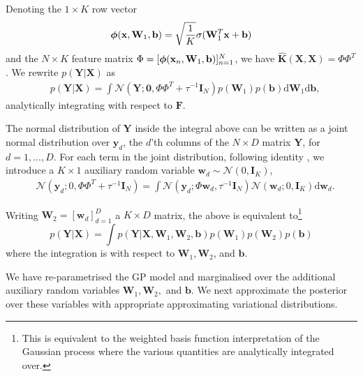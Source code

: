 \documentclass{article} %
\newcommand{\N}{\mathcal{N}}
\newcommand{\td}{\text{d}}
\newcommand{\x}{\mathbf{x}}
\newcommand{\Bb}{\mathbf{b}}
\newcommand{\y}{\mathbf{y}}
\newcommand{\w}{\mathbf{w}}
\newcommand{\W}{\mathbf{W}}
\newcommand{\X}{\mathbf{X}}
\newcommand{\Y}{\mathbf{Y}}
\newcommand{\F}{\mathbf{F}}
\newcommand{\I}{\mathbf{I}}
\newcommand{\bz}{\mathbf{0}}
\newcommand{\bphi}{\text{\boldmath$\phi$}}
\newcommand{\Kh}{\widehat{\mathbf{K}}}
\theoremstyle{definition}
\begin{document}
Denoting the $1 \times K$ row vector 
\begin{align*}
\bphi(\x, \W_1, \Bb) = \sqrt{\frac{1}{K}} \sigma(\W_1^T \x + \Bb) 
\end{align*}
and the $N \times K$ feature matrix $\Phi = [\bphi(\x_n, \W_1, \Bb)]_{n=1}^N$, we have $\Kh(\X,\X) = \Phi\Phi^T$.
We rewrite $p(\Y | \X)$ as 
\begin{align*}
&p(\Y | \X) = \int \N(\Y; \bz, \Phi\Phi^T + \tau^{-1} \I_N) p(\W_1)p(\Bb) \td \W_1 \td \Bb,
\end{align*}
analytically integrating with respect to $\F$.

The normal distribution of $\Y$ inside the integral above can be written as a joint normal distribution over $\y_d$, the $d$'th columns of the $N \times D$ matrix $\Y$, for $d = 1, ..., D$. 
For each term in the joint distribution, following identity \citep[page 93]{Bishop2006Pattern}, we introduce a $K \times 1$ auxiliary random variable $\w_d \sim \N(0, \I_K)$,
\begin{align}\label{eq:cond-prob-with-aux}
&\N(\y_d; 0, \Phi\Phi^T + \tau^{-1} \I_N) = \int \N(\y_d; \Phi\w_d, \tau^{-1} \I_N) \N(\w_d; 0, \I_K) \td \w_d.
\end{align}

Writing $\W_2 = [\w_d]_{d=1}^D$ a $K \times D$ matrix, the above is equivalent to\footnote{This is equivalent to the weighted basis function interpretation of the Gaussian process \citep{Rasmussen2005Gaussian} where the various quantities are analytically integrated over.} 
$$
p(\Y | \X) 
= \int p(\Y | \X, \W_1, \W_2, \Bb) p(\W_1) p(\W_2)p(\Bb) %
$$
where the integration is with respect to $\W_1, \W_2$, and $\Bb$.

We have re-parametrised the GP model and marginalised over the additional auxiliary random variables $\W_1, \W_2,$ and $\Bb$. We next approximate the posterior over these variables with appropriate approximating variational distributions.
\end{document}
